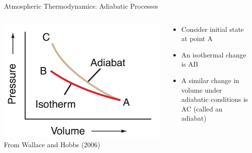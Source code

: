 \begin{frame}{Atmospheric Thermodynamics: Adiabatic Processes}
\begin{columns}[T]
    \begin{column}{.4\textwidth}
    \begin{minipage}[c][0.8\textheight][c]{\linewidth}
    \includegraphics[width=1\textwidth]{fig2}\\
    \centering \small From Wallace and Hobbs (2006)
    \end{minipage}
    \end{column}
    \begin{column}{.6\textwidth}
    \begin{minipage}[c][0.8\textheight][c]{\linewidth}
   \begin{itemize}
   	\item Consider initial state at point A
   	\item An isothermal change is AB
   	\item A similar change in volume under adiabatic conditions is AC (called an adiabat)
   \end{itemize}
      \end{minipage}
    \end{column}
  \end{columns} 
\end{frame}
